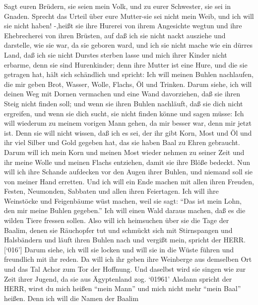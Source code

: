  Sagt euren Brüdern, sie seien mein Volk, und zu eurer
Schwester, sie sei in Gnaden.  Sprecht das Urteil über eure
Mutter-sie sei nicht mein Weib, und ich will sie nicht haben! -,heißt
sie ihre Hurerei von ihrem Angesichte wegtun und ihre Ehebrecherei von
ihren Brüsten,  auf daß ich sie nicht nackt ausziehe und
darstelle, wie sie war, da sie geboren ward, und ich sie nicht mache wie
ein dürres Land, daß ich sie nicht Durstes sterben lasse 
und mich ihrer Kinder nicht erbarme, denn sie sind Hurenkinder;
 denn ihre Mutter ist eine Hure, und die sie getragen hat,
hält sich schändlich und spricht: Ich will meinen Buhlen nachlaufen, die
mir geben Brot, Wasser, Wolle, Flachs, Öl und Trinken. 
Darum siehe, ich will deinen Weg mit Dornen vermachen und eine Wand
davorziehen, daß sie ihren Steig nicht finden soll;  und
wenn sie ihren Buhlen nachläuft, daß sie dich nicht ergreifen, und wenn
sie dich sucht, sie nicht finden könne und sagen müsse: Ich will
wiederum zu meinem vorigen Mann gehen, da mir besser war, denn mir jetzt
ist.  Denn sie will nicht wissen, daß ich es sei, der ihr
gibt Korn, Most und Öl und ihr viel Silber und Gold gegeben hat, das sie
haben Baal zu Ehren gebraucht.  Darum will ich mein Korn und
meinen Most wieder nehmen zu seiner Zeit und ihr meine Wolle und meinen
Flachs entziehen, damit sie ihre Blöße bedeckt.  Nun will
ich ihre Schande aufdecken vor den Augen ihrer Buhlen, und niemand soll
sie von meiner Hand erretten.  Und ich will ein Ende machen
mit allen ihren Freuden, Festen, Neumonden, Sabbaten und allen ihren
Feiertagen.  Ich will ihre Weinstöcke und Feigenbäume wüst
machen, weil sie sagt: ``Das ist mein Lohn, den mir meine Buhlen
gegeben.'' Ich will einen Wald daraus machen, daß es die wilden Tiere
fressen sollen.  Also will ich heimsuchen über sie die Tage
der Baalim, denen sie Räuchopfer tut und schmückt sich mit Stirnspangen
und Halsbändern und läuft ihren Buhlen nach und vergißt mein, spricht
der HERR.  {[}`016'{]} Darum siehe, ich will sie locken und
will sie in die Wüste führen und freundlich mit ihr reden. 
Da will ich ihr geben ihre Weinberge aus demselben Ort und das Tal Achor
zum Tor der Hoffnung. Und daselbst wird sie singen wie zur Zeit ihrer
Jugend, da sie aus Ägyptenland zog.  `01961' Alsdann
spricht der HERR, wirst du mich heißen ``mein Mann'' und mich nicht mehr
``mein Baal'' heißen.  Denn ich will die Namen der Baalim
